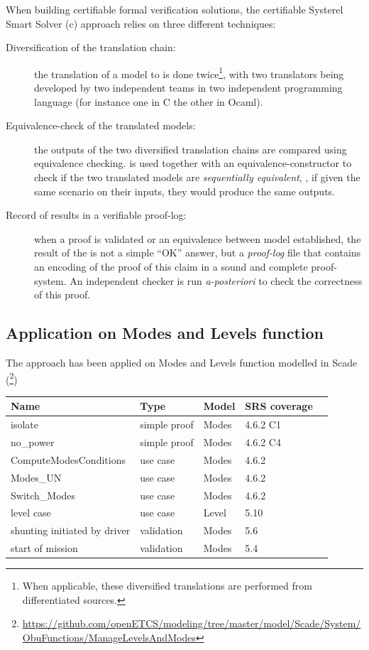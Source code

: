 When building certifiable formal verification
solutions, the certifiable Systerel Smart Solver (c\smartsolver{}) approach relies on three different techniques:
\begin{description}
\item [Diversification of the translation chain:] the translation of a model to \HLL{} is
  done twice\footnote{When applicable, these diversified translations
    are performed from differentiated sources.}, with two
  translators being developed by two independent teams in two  independent programming language (for instance one in C the other in Ocaml). 
\item [Equivalence-check of the translated models:] the  outputs of the two diversified
  translation chains are compared using equivalence
  checking. \smartsolver{} is used together with an equivalence-constructor to check if
  the two translated models are {\em sequentially equivalent}, \ie, if
  given the same scenario on their inputs, they would produce the same
  outputs.
\item [Record of results in a verifiable proof-log:] when a proof is validated or an equivalence between model established, the result of the \smartsolver{} is not a simple  ``OK'' answer, but a {\em proof-log} file that
  contains an encoding of the proof of this claim in a sound and
  complete proof-system. An independent checker is run
  \textit{a-posteriori} to check the correctness of this proof.
\end{description}





\subsection{Application on Modes and Levels function}

The approach has been applied on Modes and Levels function modelled in Scade (\footnote{\url{https://github.com/openETCS/modeling/tree/master/model/Scade/System/ObuFunctions/ManageLevelsAndModes}})

\begin{tabular}{|l|l|l|l|l}
\hline
\textbf{Name} & \textbf{Type} & \textbf{Model} & \textbf{SRS coverage} \\ \hline
isolate & simple proof & Modes  & 4.6.2 C1 \\
no\_power & simple proof & Modes  & 4.6.2 C4 \\
ComputeModesConditions & use case & Modes & 4.6.2 \\
Modes\_UN & use case & Modes & 4.6.2 \\
Switch\_Modes & use case & Modes & 4.6.2 \\
level case & use case & Level  & 5.10 &\\
shunting initiated by driver & validation & Modes  & 5.6 \\
start of mission & validation & Modes  & 5.4 \\
\hline
\end{tabular}

